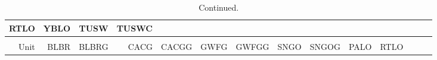 \documentclass[]{article}
\begin{document}
{\begin{longtable}[]{@{}rrrrrrrrrrrrrr@{}}
\begin{minipage}[b]{0.04\columnwidth}
RTLO\strut
\end{minipage} & \begin{minipage}[b]{0.04\columnwidth}\raggedleft\strut
YBLO\strut
\end{minipage} & \begin{minipage}[b]{0.04\columnwidth}\raggedleft\strut
TUSW\strut
\end{minipage} & \begin{minipage}[b]{0.04\columnwidth}\raggedleft\strut
TUSWC\strut
\end{minipage}\tabularnewline
\midrule
\endfirsthead
\caption{Continued.}\\%
\toprule
\begin{minipage}[b]{0.05\columnwidth}\raggedleft\strut
Unit\strut
\end{minipage} & \begin{minipage}[b]{0.05\columnwidth}\raggedleft\strut
BLBR\strut
\end{minipage} & \begin{minipage}[b]{0.05\columnwidth}\raggedleft\strut
BLBRG\strut
\end{minipage} & \begin{minipage}[b]{0.04\columnwidth}\raggedleft\strut
CACG\strut
\end{minipage} & \begin{minipage}[b]{0.05\columnwidth}\raggedleft\strut
CACGG\strut
\end{minipage} & \begin{minipage}[b]{0.05\columnwidth}\raggedleft\strut
GWFG\strut
\end{minipage} & \begin{minipage}[b]{0.05\columnwidth}\raggedleft\strut
GWFGG\strut
\end{minipage} & \begin{minipage}[b]{0.04\columnwidth}\raggedleft\strut
SNGO\strut
\end{minipage} & \begin{minipage}[b]{0.05\columnwidth}\raggedleft\strut
SNGOG\strut
\end{minipage} & \begin{minipage}[b]{0.04\columnwidth}\raggedleft\strut
PALO\strut
\end{minipage} & \begin{minipage}[b]{0.04\columnwidth}\raggedleft\strut
RTLO\strut
\end{minipage} & \begin{minipage}[b]{0.04\columnwidth}\raggedleft\strut

\end{minipage}
\end{longtable}}
\end{document}
